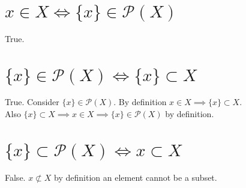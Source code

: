 \begin{parts}
\part{$x\in X \iff \{x\}\in\mathcal{P}(X)$}
\begin{solution}
  True.
\end{solution}
\part{$\{x\}\in\mathcal{P}(X) \iff \{x\}\subset X$}
\begin{solution}
  True. Consider $\{x\} \in \mathcal{P}(X)$. By definition $x \in X \implies \{x\} \subset X$.\\
  Also $\{x\} \subset X \implies x \in X \implies \{x\} \in \mathcal{P}(X)$ by definition.
\end{solution}
\part{$\{x\}\subset\mathcal{P}(X) \iff x\subset X$}
\begin{solution}
  False. $x\not\subset X$ by definition an element cannot be a subset.
\end{solution}
\end{parts}
